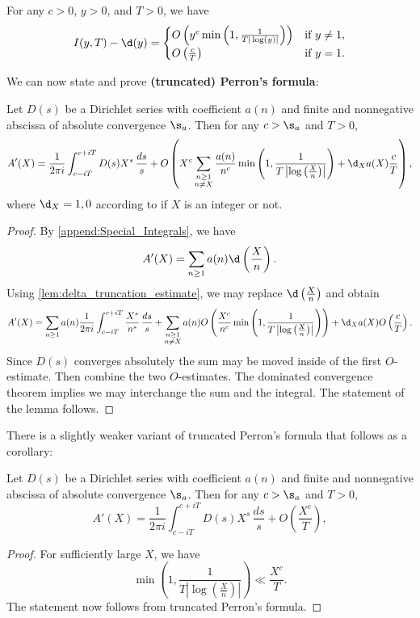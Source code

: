     \begin{lemma}\label{lem:delta_truncation_estimate}
      For any $c > 0$, $y > 0$, and $T > 0$, we have
      \[
        I(y,T)-\d(y) = \begin{cases} O\left(y^{c}\min\left(1,\frac{1}{T|\log(y)|}\right)\right) & \text{if $y \neq 1$}, \\ O\left(\frac{c}{T}\right) & \text{if $y = 1$}. \end{cases}
      \]
    \end{lemma}

    We can now state and prove \textbf{(truncated) Perron's formula}:

    \begin{theorem}
      Let $D(s)$ be a Dirichlet series with coefficient $a(n)$ and finite and nonnegative abscissa of absolute convergence $\s_{a}$. Then for any $c > \s_{a}$ and $T > 0$,
      \[
        A'(X) = \frac{1}{2\pi i}\int_{c-iT}^{c+iT}D(s)X^{s}\,\frac{ds}{s}+O\left(X^{c}\sum_{\substack{n \ge 1 \\ n \neq X}}\frac{a(n)}{n^{c}}\min\left(1,\frac{1}{T\left|\log\left(\frac{X}{n}\right)\right|}\right)+\d_{X}a(X)\frac{c}{T}\right),
      \]
      where $\d_{X} = 1,0$ according to if $X$ is an integer or not.
    \end{theorem}
    \begin{proof}
      By \cref{append:Special_Integrals}, we have
      \[
        A'(X) = \sum_{n \ge 1}a(n)\d\left(\frac{X}{n}\right).
      \]
      Using \cref{lem:delta_truncation_estimate}, we may replace $\d\left(\frac{X}{n}\right)$ and obtain
      \[
        A'(X) = \sum_{n \ge 1}a(n)\frac{1}{2\pi i}\int_{c-iT}^{c+iT}\frac{X^{s}}{n^{s}}\,\frac{ds}{s}+\sum_{\substack{n \ge 1 \\ n \neq X}}a(n)O\left(\frac{X^{c}}{n^{c}}\min\left(1,\frac{1}{T\left|\log\left(\frac{X}{n}\right)\right|}\right)\right)+\d_{X}a(X)O\left(\frac{c}{T}\right).
      \]
      Since $D(s)$ converges absolutely the sum may be moved inside of the first $O$-estimate. Then combine the two $O$-estimates. The dominated convergence theorem implies we may interchange the sum and the integral. The statement of the lemma follows.
    \end{proof}

    There is a slightly weaker variant of truncated Perron's formula that follows as a corollary:

    \begin{corollary}
      Let $D(s)$ be a Dirichlet series with coefficient $a(n)$ and finite and nonnegative abscissa of absolute convergence $\s_{a}$. Then for any $c > \s_{a}$ and $T > 0$,
      \[
        A'(X) = \frac{1}{2\pi i}\int_{c-iT}^{c+iT}D(s)X^{s}\,\frac{ds}{s}+O\left(\frac{X^{c}}{T}\right),
      \]
    \end{corollary}
    \begin{proof}
      For sufficiently large $X$, we have
      \[
        \min\left(1,\frac{1}{T\left|\log\left(\frac{X}{n}\right)\right|}\right) \ll \frac{X^{c}}{T}.
      \]
      The statement now follows from truncated Perron's formula.
    \end{proof}


